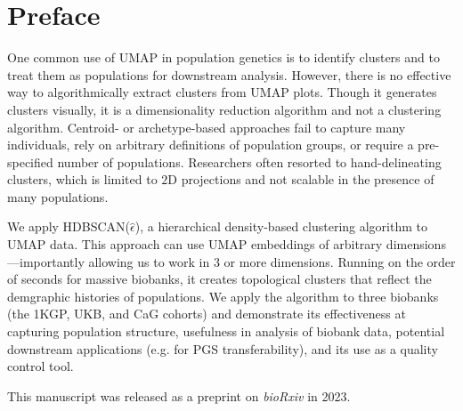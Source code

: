 \setcounter{section}{-1}

\section{Preface}

One common use of UMAP in population genetics is to identify clusters and to treat them as populations for downstream analysis. However, there is no effective way to algorithmically extract clusters from UMAP plots. Though it generates clusters visually, it is a dimensionality reduction algorithm and not a clustering algorithm. Centroid- or archetype-based approaches fail to capture many individuals, rely on arbitrary definitions of population groups, or require a pre-specified number of populations. Researchers often resorted to hand-delineating clusters, which is limited to $2$D projections and not scalable in the presence of many populations.

We apply HDBSCAN($\hat{\epsilon}$), a hierarchical density-based clustering algorithm to UMAP data. This approach can use UMAP embeddings of arbitrary dimensions---importantly allowing us to work in $3$ or more dimensions. Running on the order of seconds for massive biobanks, it creates topological clusters that reflect the demgraphic histories of populations. We apply the algorithm to three biobanks (the 1KGP, UKB, and CaG cohorts) and demonstrate its effectiveness at capturing population structure, usefulness in analysis of biobank data, potential downstream applications (e.g. for PGS transferability), and its use as a quality control tool.

This manuscript was released as a preprint on \textit{bioRxiv} in 2023.

\clearpage
